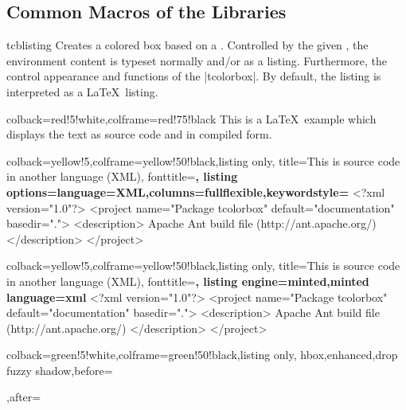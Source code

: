 \subsection{Common Macros of the Libraries}

\begin{docEnvironment}{tcblisting}{}
  Creates a colored box based on a .
  Controlled by the given , the
  environment content is typeset normally and/or as a listing.
  Furthermore, the  control appearance and functions of
  the |tcolorbox|.
  By default, the listing is interpreted as a \LaTeX\ listing.
\begin{dispExample}
\begin{tcblisting}{colback=red!5!white,colframe=red!75!black}
This is a \LaTeX\ example which displays the text as source code
and in compiled form.
\end{tcblisting}
\end{dispExample}

\clearpage

\begin{dispExample}
\begin{tcblisting}{colback=yellow!5,colframe=yellow!50!black,listing only,
    title=This is source code in another language (XML), fonttitle=\bfseries,
  listing options={language=XML,columns=fullflexible,keywordstyle=\color{red}}}
<?xml version="1.0"?>
<project name="Package tcolorbox" default="documentation" basedir=".">
  <description>
    Apache Ant build file (http://ant.apache.org/)
  </description>
</project>
\end{tcblisting}
\end{dispExample}

\enlargethispage*{10mm}

\begin{dispExample}
\begin{tcblisting}{colback=yellow!5,colframe=yellow!50!black,listing only,
    title=This is source code in another language (XML), fonttitle=\bfseries,
  listing engine=minted,minted language=xml}
<?xml version="1.0"?>
<project name="Package tcolorbox" default="documentation" basedir=".">
  <description>
    Apache Ant build file (http://ant.apache.org/)
  </description>
</project>
\end{tcblisting}
\end{dispExample}



\begin{dispExample}
\begin{tcblisting}{colback=green!5!white,colframe=green!50!black,listing only,
  hbox,enhanced,drop fuzzy shadow,before=\begin{center},after=\end{center}}
\end{tcblisting}
\end{dispExample}
\end{docEnvironment}


